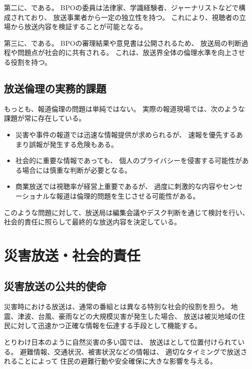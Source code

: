 第二に、である。
BPOの委員は法律家、学識経験者、ジャーナリストなどで構成されており、
放送事業者から一定の独立性を持つ。
これにより、視聴者の立場から放送内容を検証することが可能となる。

第三に、である。
BPOの審理結果や意見書は公開されるため、
放送局の判断過程や問題点が社会的に共有される。
これは、放送界全体の倫理水準を向上させる役割を持つ。

\subsection{放送倫理の実務的課題}

もっとも、報道倫理の問題は単純ではない。
実際の報道現場では、次のような課題が常に存在している。

\begin{itemize}
  \item {}  
  災害や事件の報道では迅速な情報提供が求められるが、
  速報を優先するあまり誤報が発生する危険もある。

  \item {}  
  社会的に重要な情報であっても、
  個人のプライバシーを侵害する可能性がある場合には慎重な判断が必要となる。

  \item {}  
  商業放送では視聴率が経営上重要であるが、
  過度に刺激的な内容やセンセーショナルな報道は倫理的問題を生じさせる可能性がある。
\end{itemize}

このような問題に対して、放送局は編集会議やデスク判断を通じて検討を行い、
社会的責任に照らして最終的な放送内容を決定している。

\section{災害放送・社会的責任}

\subsection{災害放送の公共的使命}

災害時における放送は、通常の番組とは異なる特別な社会的役割を担う。
地震、津波、台風、豪雨などの大規模災害が発生した場合、
放送は被災地域の住民に対して迅速かつ正確な情報を伝達する手段として機能する。

とりわけ日本のように自然災害の多い国では、
放送はとして位置付けられている。
避難情報、交通状況、被害状況などの情報は、
適切なタイミングで放送されることによって
住民の避難行動や安全確保に大きな影響を与える。

